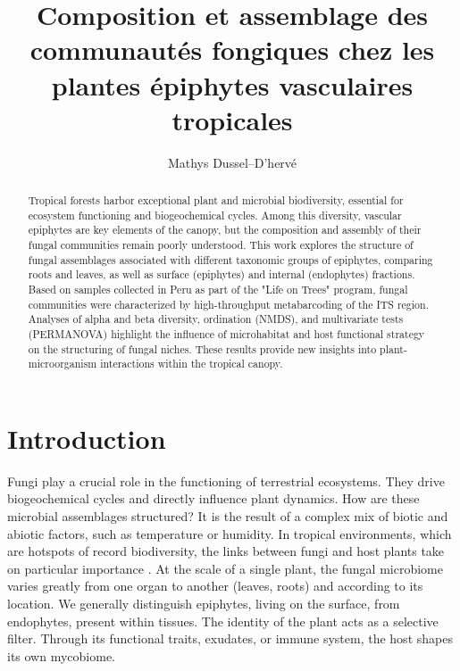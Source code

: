 \documentclass[alpha-refs,twocolumn]{wiley-article}
\title{Composition et assemblage des communautés fongiques chez les plantes épiphytes vasculaires tropicales}
\author[1\authfn{1}]{Mathys Dussel--D'hervé}
\affil[1]{Faculté de Sciences et Ingénieurie - Université de Toulouse III - Paul Sabatier, 118 route de Narbonne, 31062 Toulouse Cedex 9, France}
\begin{document}
\begin{frontmatter}
\maketitle

\begin{abstract}
Tropical forests harbor exceptional plant and microbial biodiversity, essential for ecosystem functioning and biogeochemical cycles. Among this diversity, vascular epiphytes are key elements of the canopy, but the composition and assembly of their fungal communities remain poorly understood. This work explores the structure of fungal assemblages associated with different taxonomic groups of epiphytes, comparing roots and leaves, as well as surface (epiphytes) and internal (endophytes) fractions. Based on samples collected in Peru as part of the "Life on Trees" program, fungal communities were characterized by high-throughput metabarcoding of the ITS region. Analyses of alpha and beta diversity, ordination (NMDS), and multivariate tests (PERMANOVA) highlight the influence of microhabitat and host functional strategy on the structuring of fungal niches. These results provide new insights into plant-microorganism interactions within the tropical canopy.

\end{abstract}
\end{frontmatter}

\section{Introduction}

Fungi play a crucial role in the functioning of terrestrial ecosystems. They drive biogeochemical cycles and directly influence plant dynamics. How are these microbial assemblages structured? It is the result of a complex mix of biotic and abiotic factors, such as temperature or humidity. In tropical environments, which are hotspots of record biodiversity, the links between fungi and host plants take on particular importance \citep{arnold_are_2000, bermudes_fungi_1989}. At the scale of a single plant, the fungal microbiome varies greatly from one organ to another (leaves, roots) and according to its location. We generally distinguish epiphytes, living on the surface, from endophytes, present within tissues. The identity of the plant acts as a selective filter. Through its functional traits, exudates, or immune system, the host shapes its own mycobiome.
\end{document}
